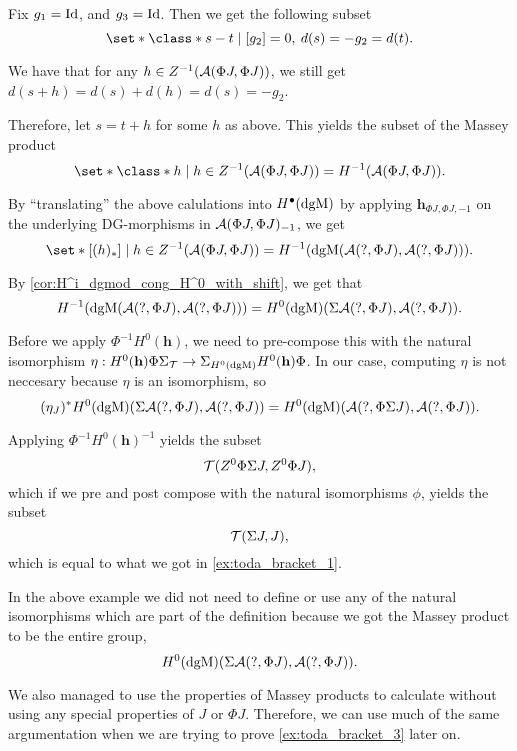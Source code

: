 \begin{example}
    Fix \( g_1 = \operatorname{Id} \), and \( g_3 = \operatorname{Id} \). Then we get the following subset
    \[
        \set*{ \class*{ s - t } \mid [g_2] = 0, \:  d(s) = - g_2 = d(t) }.
    \]

    We have that for any \( h \in Z^{-1}({\mathcal{A}}(\Phi J, \Phi J)) \), we still get \( d(s + h) = d(s) + d(h) = d(s) = - g_2 \).

    Therefore, let \( s = t + h \) for some \( h \) as above. This yields the subset of the Massey product
    \[
        \set*{ \class*{ h } \mid h \in Z^{-1}(\Ac(\Phi J, \Phi J)) } = H^{-1}(\Ac(\Phi J, \Phi J)).
    \]

    By ``translating'' the above calulations into \( H^{\bullet}(\operatorname{dgM}) \) by applying \( \mathbf{h}_{\Phi J, \Phi J, -1} \) on the underlying DG-morphisms in \( {\mathcal{A}}(\Phi J, \Phi J)_{-1} \), we get
    \[
        \set*{ [(h)_*] \mid h \in Z^{-1}(\Ac(\Phi J, \Phi J)) } = H^{-1}(\dgM(\Ac(?, \Phi J), \Ac(?, \Phi J))).
    \]

    By \autoref{cor:H^i_dgmod_cong_H^0_with_shift}, we get that
    \[
        H^{-1}(\operatorname{dgM}({\mathcal{A}}(?, \Phi J), {\mathcal{A}}(?, \Phi J))) = H^0(\operatorname{dgM})(\Sigma {\mathcal{A}}(?, \Phi J), {\mathcal{A}}(?, \Phi J)).
    \]

    Before we apply \( \Phi^{-1} H^0(\mathbf{h}) \), we need to pre-compose this with the natural isomorphism \( \eta: H^0(\mathbf{h}) \Phi \Sigma_{{\mathcal{T}}} \to \Sigma_{H^0(\operatorname{dgM})} H^0(\mathbf{h}) \Phi \). In our case, computing \( \eta \) is not neccesary because \( \eta \) is an isomorphism, so
    \[
        (\eta_J)^* H^0(\operatorname{dgM})(\Sigma {\mathcal{A}}(?, \Phi J), {\mathcal{A}}(?, \Phi J)) = H^0(\operatorname{dgM})({\mathcal{A}}(?, \Phi \Sigma J), {\mathcal{A}}(?, \Phi J)).
    \]

    Applying \( \Phi^{-1} H^0(\mathbf{h})^{-1} \) yields the subset
    \[
        {\mathcal{T}}(Z^0 \Phi \Sigma J, Z^0 \Phi J),
    \]
    which if we pre and post compose with the natural isomorphisms \( \phi \), yields the subset
    \[
        {\mathcal{T}}(\Sigma J, J),
    \]
    which is equal to what we got in \autoref{ex:toda_bracket_1}.
\end{example}

In the above example we did not need to define or use any of the natural isomorphisms which are part of the definition because we got the Massey product to be the entire group,
\[
    H^0(\operatorname{dgM})(\Sigma {\mathcal{A}}(?, \Phi J), {\mathcal{A}}(?, \Phi J)).
\]

We also managed to use the properties of Massey products to calculate without using any special properties of \( J \) or \( \Phi J \). Therefore, we can use much of the same argumentation when we are trying to prove \autoref{ex:toda_bracket_3} later on.

